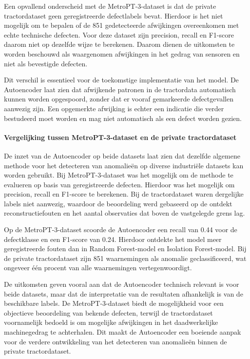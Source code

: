 {{{\newpage

Een opvallend onderscheid met de MetroPT-3-dataset is dat de private tractordataset geen geregistreerde defectlabels bevat. Hierdoor is het niet mogelijk om te bepalen of de 851 gedetecteerde afwijkingen overeenkomen met echte technische defecten. Voor deze dataset zijn precision, recall en F1-score daarom niet op dezelfde wijze te berekenen. Daarom dienen de uitkomsten te worden beschouwd als waargenomen afwijkingen in het gedrag van sensoren en niet als bevestigde defecten.

Dit verschil is essentieel voor de toekomstige implementatie van het model. De Autoencoder laat zien dat afwijkende patronen in de tractordata automatisch kunnen worden opgespoord, zonder dat er vooraf gemarkeerde defectgevallen aanwezig zijn. Een opgemerkte afwijking is echter een indicatie die verder bestudeerd moet worden en mag niet automatisch als een defect worden gezien.

\paragraph{Vergelijking tussen MetroPT-3-dataset en de private tractordataset}

De inzet van de Autoencoder op beide datasets laat zien dat dezelfde algemene methode voor het detecteren van anomalieën op diverse industriële datasets kan worden gebruikt. Bij MetroPT-3-dataset was het mogelijk om de methode te evalueren op basis van geregistreerde defecten. Hierdoor was het mogelijk om precision, recall en F1-score te berekenen. Bij de tractordataset waren dergelijke labels niet aanwezig, waardoor de beoordeling werd gebaseerd op de ontdekt reconstructiefouten en het aantal observaties dat boven de vastgelegde grens lag.

Op de MetroPT-3-dataset scoorde de Autoencoder een recall van 0.44 voor de defectklasse en een F1-score van 0.24. Hierdoor ontdekte het model meer geregistreerde fouten dan in Random Forest-model en Isolation Forest-model. Bij de private tractordataset zijn 851 waarnemingen als anomalie geclassificeerd, wat ongeveer één procent van alle waarnemingen vertegenwoordigt.

De uitkomsten geven vooral aan dat de Autoencoder technisch relevant is voor beide datasets, maar dat de interpretatie van de resultaten afhankelijk is van de beschikbare labels. De MetroPT-3-dataset biedt de mogelijkheid voor een objectieve beoordeling van bekende defecten, terwijl de tractordataset voornamelijk bedoeld is om mogelijke afwijkingen in het daadwerkelijke machinegedrag te achterhalen. Dit maakt de Autoencoder een boeiende aanpak voor de verdere ontwikkeling van het detecteren van anomalieën binnen de private tractordataset.

}}}
